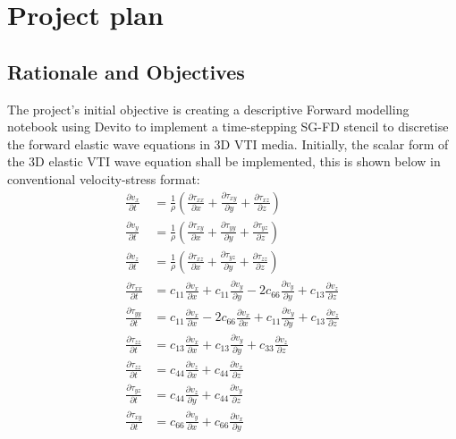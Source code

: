 \newpage
\section{Project plan}

\subsection{Rationale and Objectives}
The project's initial objective is creating a descriptive Forward modelling notebook using Devito to implement a time-stepping SG-FD stencil to discretise the forward elastic wave equations in 3D VTI media. Initially, the scalar form of the 3D elastic VTI wave equation shall be implemented, this is shown below in conventional velocity-stress format:
$$
\begin{aligned}
\frac{\partial v_x}{\partial t} &= \frac{1}{\rho} \left( \frac{\partial \tau_{xx}}{\partial x} + \frac{\partial \tau_{xy}}{\partial y} + \frac{\partial \tau_{xz}}{\partial z} \right) \\
\frac{\partial v_y}{\partial t} &= \frac{1}{\rho} \left( \frac{\partial \tau_{xy}}{\partial x} + \frac{\partial \tau_{yy}}{\partial y} + \frac{\partial \tau_{yz}}{\partial z} \right) \\
\frac{\partial v_z}{\partial t} &= \frac{1}{\rho} \left( \frac{\partial \tau_{xz}}{\partial x} + \frac{\partial \tau_{yz}}{\partial y} + \frac{\partial \tau_{zz}}{\partial z} \right) \\
\frac{\partial \tau_{xx}}{\partial t} &= c_{11}\frac{\partial v_{x}}{\partial x} + c_{11}\frac{\partial v_{y}}{\partial y} - 2c_{66}\frac{\partial v_{y}}{\partial y} + c_{13}\frac{\partial v_{z}}{\partial z} \\
\frac{\partial \tau_{yy}}{\partial t} &= c_{11}\frac{\partial v_{x}}{\partial x} - 2c_{66}\frac{\partial v_{x}}{\partial x} + c_{11}\frac{\partial v_{y}}{\partial y} + c_{13}\frac{\partial v_{z}}{\partial z} \\
\frac{\partial \tau_{zz}}{\partial t} &= c_{13}\frac{\partial v_{x}}{\partial x} + c_{13}\frac{\partial v_{y}}{\partial y} + c_{33}\frac{\partial v_{z}}{\partial z} \\
\frac{\partial \tau_{zz}}{\partial t} &= c_{44}\frac{\partial v_{z}}{\partial x} + c_{44}\frac{\partial v_{x}}{\partial z} \\
\frac{\partial \tau_{yz}}{\partial t} &= c_{44}\frac{\partial v_{z}}{\partial y} + c_{44}\frac{\partial v_{y}}{\partial z} \\
\frac{\partial \tau_{xy}}{\partial t} &= c_{66}\frac{\partial v_{y}}{\partial x} + c_{66}\frac{\partial v_{x}}{\partial y} \\
\end{aligned}
$$
